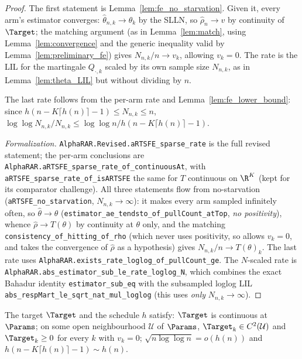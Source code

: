 \begin{proof}\leanok
{}
The first statement is Lemma~\ref{lem:fe_no_starvation}. Given it, every arm's
estimator converges: $\hat{\theta}_{n,k}\to\theta_k$ by the SLLN, so
$\hat{\rho}_n\to v$ by continuity of $\Target$; the matching argument (as in
Lemma~\ref{lem:match}, using Lemma~\ref{lem:convergence} and the generic
inequality valid by Lemma~\ref{lem:preliminary_fe}) gives $N_{n,k}/n\to v_k$,
allowing $v_k=0$. The rate is the LIL for the martingale $Q_{\cdot,k}$ scaled by
its own sample size $N_{n,k}$, as in Lemma~\ref{lem:theta_LIL} but without
dividing by $n$.

The last rate follows from the per-arm rate and Lemma~\ref{lem:fe_lower_bound}: since
$h(n-K\lceil h(n)\rceil-1)\le N_{n,k}\le n$, $\log\log N_{n,k}/N_{n,k}\le\log\log n/h(n-K\lceil
h(n)\rceil-1)$.

\emph{Formalization.} \texttt{AlphaRAR.Revised.aRTSFE\_sparse\_rate} is the full revised statement;
the per-arm conclusions are \texttt{AlphaRAR.aRTSFE\_sparse\_rate\_of\_continuousAt}, with
\texttt{aRTSFE\_sparse\_rate\_of\_isARTSFE} the same for $T$ continuous on $\R^K$ (kept for its
comparator challenge). All three statements flow from
no-starvation (\texttt{aRTSFE\_no\_starvation}, $N_{n,k}\to\infty$): it makes every arm sampled
infinitely often, so $\hat\theta\to\theta$ (\texttt{estimator\_ae\_tendsto\_of\_pullCount\_atTop},
\emph{no positivity}), whence $\hat\rho\to T(\theta)$ by continuity at $\theta$ only, and the
matching \texttt{consistency\_of\_hitting\_of\_rho} (which never uses positivity, so allows $v_k=0$,
and takes the convergence of $\hat\rho$ as a hypothesis) gives $N_{n,k}/n\to T(\theta)_k$. The
last rate uses \texttt{AlphaRAR.exists\_rate\_loglog\_of\_pullCount\_ge}. The $N$-scaled rate is \texttt{AlphaRAR.abs\_estimator\_sub\_le\_rate\_loglog\_N},
which combines the exact Bahadur identity \texttt{estimator\_sub\_eq} with the subsampled loglog LIL
\texttt{abs\_respMart\_le\_sqrt\_nat\_mul\_loglog} (this uses \emph{only} $N_{n,k}\to\infty$).
\end{proof}

\begin{definition}[Condition C]\label{def:condC}
\leanok
{}
The target $\Target$ and the schedule $h$ satisfy: $\Target$ is continuous at $\Params$; on some
open neighbourhood $\mathcal U$ of $\Params$, $\Target_k\in C^2(\mathcal U)$ and $\Target_k\ge0$
for every $k$ with $v_k=0$; $\sqrt{n\log\log n}=o(h(n))$ and $h(n-K\lceil h(n)\rceil-1)\sim h(n)$.
\end{definition}

